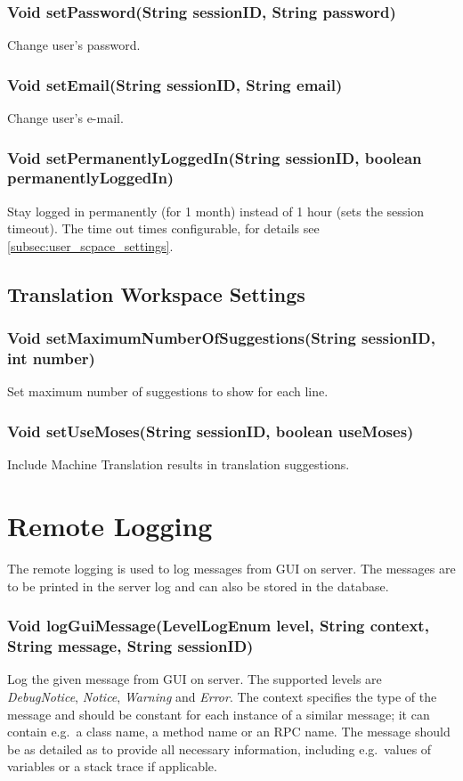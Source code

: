 {\subsubsection{Void setPassword(String sessionID, String password)}
Change user's password.

\subsubsection{Void setEmail(String sessionID, String email)}
Change user's e-mail.

\subsubsection{Void setPermanentlyLoggedIn(String sessionID, boolean permanentlyLoggedIn)}
Stay logged in permanently (for 1 month) instead of 1 hour (sets the session timeout). The time out times configurable, for details see \ref{subsec:user_scpace_settings}.

\subsection{Translation Workspace Settings}

\subsubsection{Void setMaximumNumberOfSuggestions(String sessionID, int number)}
Set maximum number of suggestions to show for each line.

\subsubsection{Void setUseMoses(String sessionID, boolean useMoses)}
Include Machine Translation results in translation suggestions.

\section{Remote Logging}
\label{sec:rpc:remotelog}

The remote logging is used to log messages from GUI on server. The messages are to be printed in the server log and can also be stored in the database.

\subsubsection{Void logGuiMessage(LevelLogEnum level, String context, String message, String sessionID)}
Log the given message from GUI on server.
The supported levels are \emph{DebugNotice}, \emph{Notice}, \emph{Warning} and \emph{Error}.
The context specifies the type of the message and should be constant for each instance of a similar message; it can contain e.g.\ a class name, a method name or an RPC name. The message should be as detailed as to provide all necessary information, including e.g.\ values of variables or a stack trace if applicable.

}

